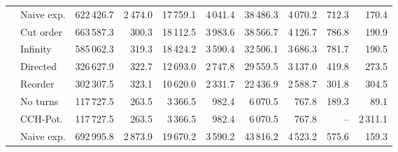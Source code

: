 \begin{tabular}{llrrrrrrrr}
       & Naive exp. &                 622\,426.7 &          2\,474.0 &                                         17\,759.1 &                                           4\,041.4 &                                           38\,486.3 &                                             4\,070.2 &  712.3 &  170.4 \\
       & Cut order &                 663\,587.3 &           300.3 &                                         18\,112.5 &                                           3\,983.6 &                                           38\,566.7 &                                             4\,126.7 &  786.8 &  190.9 \\
       & Infinity &                 585\,062.3 &           319.3 &                                         18\,424.2 &                                           3\,590.4 &                                           32\,506.1 &                                             3\,686.3 &  781.7 &  190.5 \\
       & Directed &                 326\,627.9 &           322.7 &                                         12\,693.0 &                                           2\,747.8 &                                           29\,559.5 &                                             3\,137.0 &  419.8 &  273.5 \\
       & Reorder &                 302\,307.5 &           323.1 &                                         10\,620.0 &                                           2\,331.7 &                                           22\,436.9 &                                             2\,588.7 &  301.8 &  304.5 \\
\addlinespace \multirow{7}{*}{\rotatebox[origin=c]{90}{Europe}} & No turns &                 117\,727.5 &           263.5 &                                          3\,366.5 &                                            982.4 &                                            6\,070.5 &                                              767.8 &  189.3 &   89.1 \\
       & CCH-Pot. &                 117\,727.5 &           263.5 &                                          3\,366.5 &                                            982.4 &                                            6\,070.5 &                                              767.8 &    -- & 2\,311.1 \\
       & Naive exp. &                 692\,995.8 &          2\,873.9 &                                         19\,670.2 &                                           3\,590.2 &                                           43\,816.2 &                                             4\,523.2 &  575.6 &  159.3 \\

\end{tabular}
